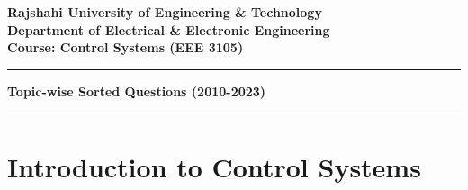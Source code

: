 \documentclass[12pt, a4paper]{article}
\begin{document}
	
	\begin{center}
	\large\textbf{Rajshahi University of Engineering \& Technology} \\
	\textbf{Department of Electrical \& Electronic Engineering} \\
	\textbf{Course: Control Systems (EEE 3105)} \\
	\hrule
	\vspace{0.5cm}
	\huge\textbf{Topic-wise Sorted Questions (2010-2023)}
	\vspace{0.5cm}
	\hrule
\end{center}
	\tableofcontents
	\newpage
	\section{Introduction to Control Systems}
	
\end{document}
